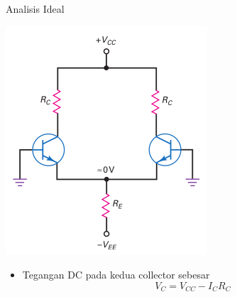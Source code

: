 \documentclass[aspectratio=169]{beamer}
\begin{document}
\begin{frame}{Analisis Ideal}
	\begin{multicols}{2}
		\begin{center}
			\includegraphics[width=0.7\textheight]{gambar/01.ideal_dc_analysis}
		\end{center}
		\columnbreak
		\begin{itemize}
			\item Tegangan DC pada kedua collector sebesar \\
			\begin{equation} \label{pers.7}
				V_C = V_{CC} - I_C R_C
			\end{equation}
		\end{itemize}
		\vfill\null
	\end{multicols}
\end{frame}
\end{document}
